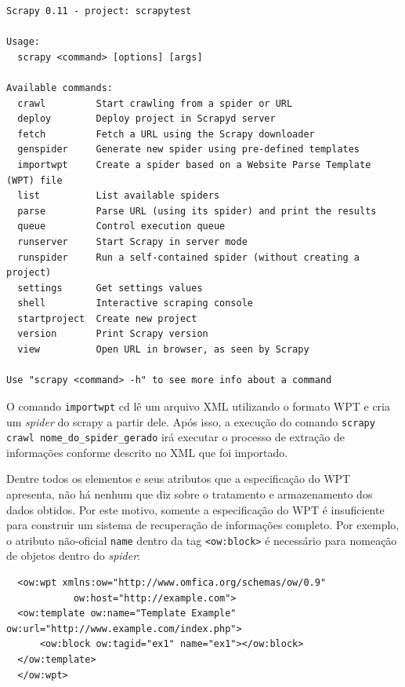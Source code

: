 \pagebreak
{}
\begin{lstlisting}
Scrapy 0.11 - project: scrapytest

Usage:
  scrapy <command> [options] [args]

Available commands:
  crawl         Start crawling from a spider or URL
  deploy        Deploy project in Scrapyd server
  fetch         Fetch a URL using the Scrapy downloader
  genspider     Generate new spider using pre-defined templates
  importwpt     Create a spider based on a Website Parse Template (WPT) file
  list          List available spiders
  parse         Parse URL (using its spider) and print the results
  queue         Control execution queue
  runserver     Start Scrapy in server mode
  runspider     Run a self-contained spider (without creating a project)
  settings      Get settings values
  shell         Interactive scraping console
  startproject  Create new project
  version       Print Scrapy version
  view          Open URL in browser, as seen by Scrapy

Use "scrapy <command> -h" to see more info about a command

\end{lstlisting}

O comando \texttt{importwpt} cd lê um arquivo XML utilizando o formato WPT e cria um \emph{spider} do scrapy a partir dele. Após isso, a execução do comando \texttt{scrapy crawl nome\_do\_spider\_gerado} irá executar o processo de extração de informações conforme descrito no XML que foi importado.

Dentre todos os elementos e seus atributos que a especificação do WPT apresenta, não há nenhum que diz sobre o tratamento e armazenamento dos dados obtidos. Por este motivo, somente a especificação do WPT é insuficiente para construir um sistema de recuperação de informações completo. Por exemplo, o atributo não-oficial \texttt{name} dentro da tag \texttt{<ow:block>} é necessário para nomeação de objetos dentro do \emph{spider}:

\begin{lstlisting}
  <ow:wpt xmlns:ow="http://www.omfica.org/schemas/ow/0.9"
            ow:host="http://example.com">
  <ow:template ow:name="Template Example" ow:url="http://www.example.com/index.php">
      <ow:block ow:tagid="ex1" name="ex1"></ow:block>
  </ow:template> 
  </ow:wpt>
\end{lstlisting}

